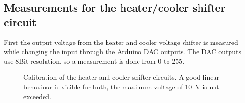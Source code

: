 \documentclass[12pt]{scrartcl}
\begin{document}
      \subsection{Measurements for the heater/cooler shifter circuit}
        First the output voltage from the heater and cooler voltage shifter is measured while
        changing the input through the Arduino DAC outputs. The DAC outputs use
        8Bit resolution, so a measurement is done from 0 to 255.
        \begin{figure}[h]
          \caption{Calibration of the heater and cooler shifter circuits. A good
          linear behaviour is visible for both, the maximum voltage of 10~V is
          not exceeded.}
          \label{fig8}
        \end{figure}
\end{document}
